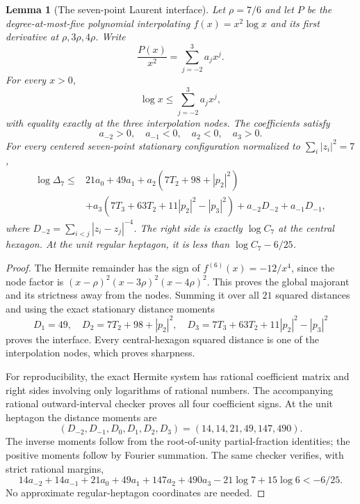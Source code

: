 \documentclass[11pt]{article}
\newtheorem{lemma}[theorem]{Lemma}
\theoremstyle{remark}
\numberwithin{equation}{section}
\begin{document}
\begin{lemma}[The seven-point Laurent interface]
\label{lem:noorigin-oct8-seven-laurent}
Let $\rho=7/6$ and let $P$ be the degree-at-most-five polynomial
interpolating $f(x)=x^2\log x$ and its first derivative at
$\rho,3\rho,4\rho$. Write
\[
       \frac{P(x)}{x^2}=\sum_{j=-2}^{3}a_jx^j.
\]
For every $x>0$,
\[
                   \log x\le\sum_{j=-2}^{3}a_jx^j,
\]
with equality exactly at the three interpolation nodes.
The coefficients satisfy
\[
              a_{-2}>0,\quad a_{-1}<0,\quad a_2<0,\quad a_3>0.
\]
For every centered seven-point stationary configuration normalized
to $\sum_i|z_i|^2=7$,
\begin{align}\label{eq:noorigin-oct8-seven-laurent}
 \log\Delta_7\le{}&21a_0+49a_1
       +a_2(7T_2+98+|p_2|^2)\nonumber\\
       &+a_3(7T_3+63T_2+11|p_2|^2-|p_3|^2)
         +a_{-2}D_{-2}+a_{-1}D_{-1},
\end{align}
where $D_{-2}=\sum_{i<j}|z_i-z_j|^{-4}$.
The right side is exactly $\log C_7$ at the central hexagon.
At the unit regular heptagon, it is less than $\log C_7-6/25$.
\end{lemma}
\begin{proof}
The Hermite remainder has the sign of
$f^{(6)}(x)=-12/x^4$, since the node factor is
$(x-\rho)^2(x-3\rho)^2(x-4\rho)^2$. This proves the global
majorant and its strictness away from the nodes.
Summing it over all $21$ squared distances and using the exact
stationary distance moments
\[
 D_1=49,\quad D_2=7T_2+98+|p_2|^2,\quad
 D_3=7T_3+63T_2+11|p_2|^2-|p_3|^2
\]
proves the interface. Every central-hexagon squared distance is one
of the interpolation nodes, which proves sharpness.

For reproducibility, the exact Hermite system has rational coefficient
matrix and right sides involving only logarithms of rational numbers.
The accompanying rational outward-interval checker proves all four
coefficient signs. At the unit heptagon the distance moments are
\[
        (D_{-2},D_{-1},D_0,D_1,D_2,D_3)
                       =(14,14,21,49,147,490).
\]
The inverse moments follow from the root-of-unity partial-fraction
identities; the positive moments follow by Fourier summation.
The same checker verifies, with strict rational margins,
\[
 14a_{-2}+14a_{-1}+21a_0+49a_1+147a_2+490a_3
              -21\log7+15\log6<-6/25.
\]
No approximate regular-heptagon coordinates are needed.
\end{proof}
\end{document}
